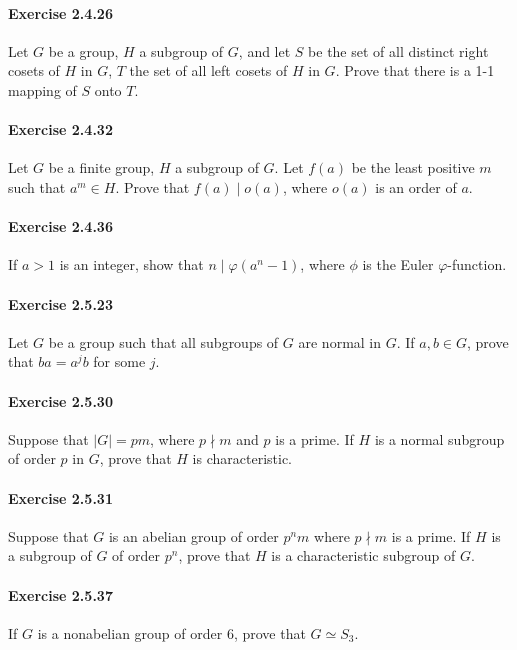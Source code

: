 \documentclass{article}
\begin{document}
\paragraph{Exercise 2.4.26} Let $G$ be a group, $H$ a subgroup of $G$, and let $S$ be the set of all distinct right cosets of $H$ in $G$, $T$ the set of all left cosets of $H$ in $G$. Prove that there is a 1-1 mapping of $S$ onto $T$.

\paragraph{Exercise 2.4.32} Let $G$ be a finite group, $H$ a subgroup of $G$. Let $f(a)$ be the least positive $m$ such that $a^m \in H$. Prove that $f(a) \mid o(a)$, where $o(a)$ is an order of $a$.

\paragraph{Exercise 2.4.36} If $a > 1$ is an integer, show that $n \mid \varphi(a^n - 1)$, where $\phi$ is the Euler $\varphi$-function.

\paragraph{Exercise 2.5.23} Let $G$ be a group such that all subgroups of $G$ are normal in $G$. If $a, b \in G$, prove that $ba = a^jb$ for some $j$.

\paragraph{Exercise 2.5.30} Suppose that $|G| = pm$, where $p \nmid m$ and $p$ is a prime. If $H$ is a normal subgroup of order $p$ in $G$, prove that $H$ is characteristic.

\paragraph{Exercise 2.5.31} Suppose that $G$ is an abelian group of order $p^nm$ where $p \nmid m$ is a prime.  If $H$ is a subgroup of $G$ of order $p^n$, prove that $H$ is a characteristic subgroup of $G$.

\paragraph{Exercise 2.5.37} If $G$ is a nonabelian group of order 6, prove that $G \simeq S_3$.
\end{document}
